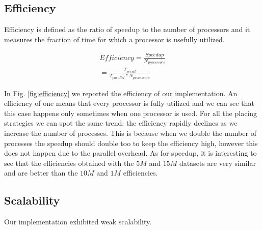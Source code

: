 \subsection{Efficiency}
Efficiency is defined as the ratio of speedup to the
number of processors and it measures the fraction of
time for which a processor is usefully utilized.

\begin{equation}
    \begin{split}
        Efficiency = \frac{Speedup}{N_{processors}} \\
        = \frac{T_{serial}}{T_{parallel} * N_{processors}}
    \end{split}
\end{equation}

In Fig. \ref{fig:efficiency} we reported the efficiency of our implementation.
An efficiency of one means that every processor is fully utilized and we can see that
this case happens only sometimes when one processor is used.
For all the placing strategies we can spot the same trend: the efficiency rapidly declines as we
increase the number of processes. This is because when we double the number of processes the speedup should
double too to keep the efficiency high, however this does not happen due to the parallel overhead.
As for speedup, it is interesting to see that the efficiencies obtained with the $5M$ and $15M$ datasets are very similar and are
better than the $10M$ and $1M$ efficiencies.

\subsection{Scalability}
Our implementation exhibited weak scalability.

